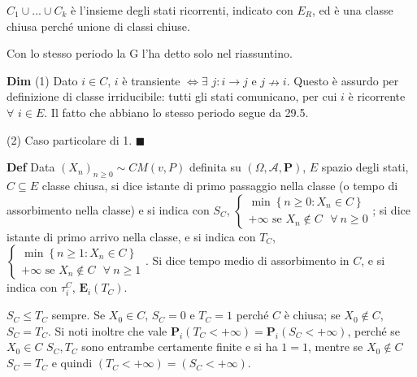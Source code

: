 \documentclass{article}
\begin{document}
$C_{1}\cup ...\cup C_{k}$ \`{e} l'insieme degli stati ricorrenti, indicato
con $E_{R}$, ed \`{e} una classe chiusa perch\'{e} unione di classi chiuse.

Con lo stesso periodo la G l'ha detto solo nel riassuntino.

\textbf{Dim} (1) Dato $i\in C$, $i$ \`{e} transiente $\Longleftrightarrow
\exists $ $j:i\rightarrow j$ e $j\nrightarrow i$. Questo \`{e} assurdo per
definizione di classe irriducibile: tutti gli stati comunicano, per cui $i$ 
\`{e} ricorrente $\forall $ $i\in E$. Il fatto che abbiano lo stesso periodo
segue da 29.5.

(2) Caso particolare di 1. $\blacksquare $

\textbf{Def} Data $\left( X_{n}\right) _{n\geq 0}\sim CM\left( v,P\right) $
definita su $\left( \Omega ,\mathcal{A},\mathbf{P}\right) $, $E$ spazio
degli stati, $C\subseteq E$ classe chiusa, si dice istante di primo
passaggio nella classe (o tempo di assorbimento nella classe) e si indica
con $S_{C}$, $\left\{ 
\begin{array}{c}
\min \left\{ n\geq 0:X_{n}\in C\right\} \\ 
+\infty \text{ se }X_{n}\not\in C\text{ }\forall ~n\geq 0%
\end{array}%
\right. $; si dice istante di primo arrivo nella classe, e si indica con $%
T_{C}$, $\left\{ 
\begin{array}{c}
\min \left\{ n\geq 1:X_{n}\in C\right\} \\ 
+\infty \text{ se }X_{n}\not\in C\text{ }\forall ~n\geq 1%
\end{array}%
\right. $. Si dice tempo medio di assorbimento in $C$, e si indica con $\tau
_{i}^{C}$, $\mathbf{E}_{i}\left( T_{C}\right) $.

$S_{C}\leq T_{C}$ sempre. Se $X_{0}\in C$, $S_{C}=0$ e $T_{C}=1$ perch\'{e} $%
C$ \`{e} chiusa; se $X_{0}\not\in C$, $S_{C}=T_{C}$. Si noti inoltre che
vale $\mathbf{P}_{i}\left( T_{C}<+\infty \right) =\mathbf{P}_{i}\left(
S_{C}<+\infty \right) $, perch\'{e} se $X_{0}\in C$ $S_{C},T_{C}$ sono
entrambe certamente finite e si ha $1=1$, mentre se $X_{0}\not\in C$ $%
S_{C}=T_{C}$ e quindi $\left( T_{C}<+\infty \right) =\left( S_{C}<+\infty
\right) $.
\end{document}
